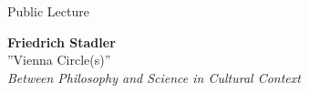 \documentclass[a4paper]{article}
\begin{document}
\printGenericVSLHeader
\begin{center}
\begin{vsltext}{1.8cm}{2.2cm}
    Public Lecture

    \vspace{1cm}

    \textbf{Friedrich Stadler}\\
    ''Vienna Circle(s)''\\
    {\fontsize{1cm}{1.2cm}\selectfont \emph{Between Philosophy and Science in Cultural
    Context}}

    \vspace{1.5cm}

    \fontsize{1.2cm}{1.5cm}


\end{vsltext}

\end{center}
\end{document}
